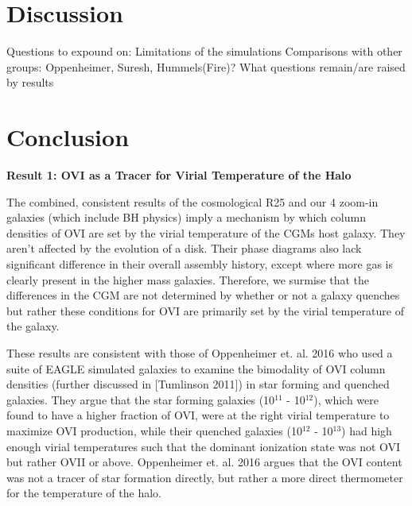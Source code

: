\documentclass[]{emulateapj}
\begin{document}

\section{Discussion} 
\label{Discuss}

Questions to expound on:
Limitations of the simulations
Comparisons with other groups: Oppenheimer, Suresh, Hummels(Fire)?
What questions remain/are raised by results 





\section{Conclusion} 
\label{Conclude}

\textbf{Result 1: OVI as a Tracer for Virial Temperature of the Halo}

The combined, consistent results of the cosmological R25 and our 4 zoom-in galaxies (which include BH physics) imply a mechanism by which column densities of OVI are set by the virial temperature of the CGMs host galaxy. They aren't affected by the evolution of a disk. Their phase diagrams also lack significant difference in their overall assembly history, except where more gas is clearly present in the higher mass galaxies. Therefore, we surmise that the differences in the CGM are not determined by whether or not a galaxy quenches but rather these conditions for OVI are primarily set by the virial temperature of the galaxy. 

These results are consistent with those of Oppenheimer et. al. 2016 who used a suite of EAGLE simulated galaxies to examine the bimodality of OVI column densities (further discussed in [Tumlinson 2011]) in star forming and quenched galaxies. They argue that the star forming galaxies (10$^{11}$ - 10$^{12}$), which were found to have a higher fraction of OVI, were at the right virial temperature to maximize OVI production, while their quenched galaxies (10$^{12}$ - 10$^{13}$) had high enough virial temperatures such that the dominant ionization state was not OVI but rather OVII or above. Oppenheimer et. al. 2016 argues that the OVI content was not a tracer of star formation directly, but rather a more direct thermometer for the temperature of the halo.
\end{document}
